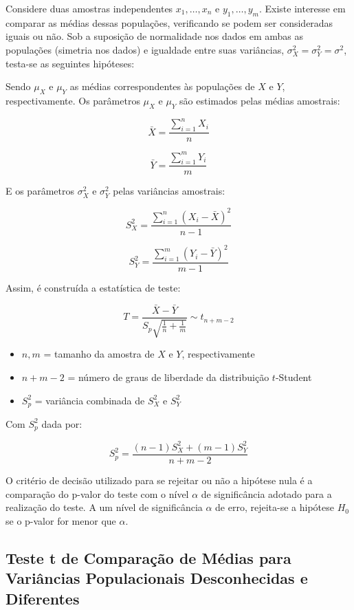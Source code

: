 \documentclass[
  portuguese,
]{estat/estat}
\providecommand{\tightlist}{%
  \setlength{\itemsep}{0pt}\setlength{\parskip}{0pt}}
\begin{document}
Considere duas amostras independentes \(x_1, \ldots, x_n\) e
\(y_1, \ldots, y_m\). Existe interesse em comparar as médias dessas
populações, verificando se podem ser consideradas iguais ou não. Sob a
suposição de normalidade nos dados em ambas as populações (simetria nos
dados) e igualdade entre suas variâncias,
\(\sigma_X^2 = \sigma_Y^2 = \sigma^2\), testa-se as seguintes hipóteses:


Sendo \(\mu_X\) e \(\mu_Y\) as médias correspondentes às populações de
\(X\) e \(Y\), respectivamente. Os parâmetros \(\mu_X\) e \(\mu_Y\) são
estimados pelas médias amostrais:

\[
\bar{X} = \frac{\sum_{i=1}^{n} X_i}{n}
\]

\[
\bar{Y} = \frac{\sum_{i=1}^{m} Y_i}{m}
\]

E os parâmetros \(\sigma_X^2\) e \(\sigma_Y^2\) pelas variâncias
amostrais:

\[
S_X^2 = \frac{\sum_{i=1}^{n} (X_i - \bar{X})^2}{n-1}
\]

\[
S_Y^2 = \frac{\sum_{i=1}^{m} (Y_i - \bar{Y})^2}{m-1}
\]

Assim, é construída a estatística de teste:

\[
T = \frac{\bar{X} - \bar{Y}}{S_p \sqrt{\frac{1}{n} + \frac{1}{m}}} \sim t_{n+m-2}
\]

\begin{itemize}
\tightlist
\item
  \(n, m\) = tamanho da amostra de \(X\) e \(Y\), respectivamente
\item
  \(n+m-2\) = número de graus de liberdade da distribuição \(t\)-Student
\item
  \(S_p^2\) = variância combinada de \(S_X^2\) e \(S_Y^2\)
\end{itemize}

Com \(S_p^2\) dada por:

\[
S_p^2 = \frac{(n-1)S^2_X + (m-1)S^2_Y}{n+m-2}
\]

O critério de decisão utilizado para se rejeitar ou não a hipótese nula
é a comparação do p-valor do teste com o nível \(\alpha\) de
significância adotado para a realização do teste. A um nível de
significância \(\alpha\) de erro, rejeita-se a hipótese \(H_{0}\) se o
p-valor for menor que \(\alpha\).

\subsection{Teste t de Comparação de Médias para Variâncias
Populacionais Desconhecidas e
Diferentes}\label{teste-t-de-comparauxe7uxe3o-de-muxe9dias-para-variuxe2ncias-populacionais-desconhecidas-e-diferentes}
\end{document}
